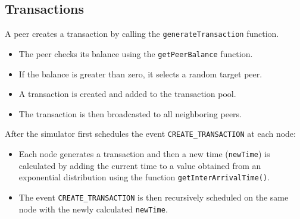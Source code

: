 \documentclass[a4paper,12pt]{article}
\begin{document}
\subsection*{Transactions}
A peer creates a transaction by calling the \texttt{generateTransaction} function.
	\begin{itemize}
		\item The peer checks its balance using the \texttt{getPeerBalance} function.
		\item If the balance is greater than zero, it selects a random target peer.
		\item A transaction is created and added to the transaction pool.
		\item The transaction is then broadcasted to all neighboring peers.
	\end{itemize}

			

\newpage
After the simulator first schedules the event \texttt{CREATE\_TRANSACTION} at each node:
    \begin{itemize}
        \item Each node generates a transaction and then a new time (\texttt{newTime}) is calculated by adding the current time to a value obtained from an exponential distribution using the function \texttt{getInterArrivalTime()}.
        \item The event \texttt{CREATE\_TRANSACTION} is then recursively scheduled on the same node with the newly calculated \texttt{newTime}.
    \end{itemize}
\end{document}
